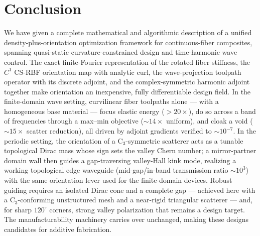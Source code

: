 \documentclass[11pt]{article}
\begin{document}
\section{Conclusion}
We have given a complete mathematical and algorithmic description of a unified
density-plus-orientation optimization framework for continuous-fiber composites,
spanning quasi-static curvature-constrained design and time-harmonic wave
control. The exact finite-Fourier representation of the rotated fiber stiffness,
the $C^1$ CS-RBF orientation map with analytic curl, the wave-projection toolpath
operator with its discrete adjoint, and the complex-symmetric harmonic adjoint
together make orientation an inexpensive, fully differentiable design field. In
the finite-domain wave setting, curvilinear fiber toolpaths alone --- with a
homogeneous base material --- focus elastic energy ($>\!20\times$), do so across a
band of frequencies through a max--min objective ($\sim\!14\times$ uniform), and
cloak a void ($\sim\!15\times$ scatter reduction), all driven by adjoint gradients
verified to $\sim\!10^{-7}$. In the periodic setting, the orientation of a
C$_3$-symmetric scatterer acts as a tunable topological Dirac mass whose sign
sets the valley Chern number; a mirror-partner domain wall then guides a
gap-traversing valley-Hall kink mode, realizing a working topological edge
waveguide (mid-gap/in-band transmission ratio $\sim\!10^3$) with the same
orientation lever used for the finite-domain devices. Robust guiding requires an
isolated Dirac cone and a complete gap --- achieved here with a C$_3$-conforming
unstructured mesh and a near-rigid triangular scatterer --- and, for sharp
$120^\circ$ corners, strong valley polarization that remains a design target. The
manufacturability machinery carries over unchanged, making these designs
candidates for additive fabrication.
\end{document}
